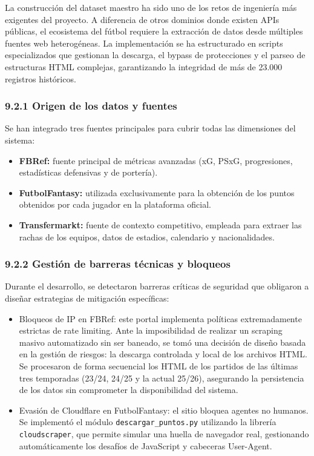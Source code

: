 La construcción del dataset maestro ha sido uno de los retos de ingeniería más exigentes del proyecto. A diferencia de otros dominios donde existen APIs públicas,
el ecosistema del fútbol requiere la extracción de datos desde múltiples fuentes web heterogéneas. La implementación se ha estructurado en scripts especializados
que gestionan la descarga, el bypass de protecciones y el parseo de estructuras HTML complejas, garantizando la integridad de más de 23.000 registros históricos.
 
\subsubsection{9.2.1 Origen de los datos y fuentes}
 
Se han integrado tres fuentes principales para cubrir todas las dimensiones del sistema:
 
\begin{itemize}
\item \textbf{FBRef:} fuente principal de métricas avanzadas (xG, PSxG, progresiones, estadísticas defensivas y de portería).
\item \textbf{FutbolFantasy:} utilizada exclusivamente para la obtención de los puntos obtenidos por cada jugador en la plataforma oficial.
\item \textbf{Transfermarkt:} fuente de contexto competitivo, empleada para extraer las rachas de los equipos, datos de estadios, calendario y nacionalidades.
\end{itemize}
 
\subsubsection{9.2.2 Gestión de barreras técnicas y bloqueos}
 
Durante el desarrollo, se detectaron barreras críticas de seguridad que obligaron a diseñar estrategias de mitigación específicas:
 
\begin{itemize}
\item Bloqueos de IP en FBRef: este portal implementa políticas extremadamente estrictas de rate limiting. Ante la imposibilidad de realizar un scraping masivo
automatizado sin ser baneado, se tomó una decisión de diseño basada en la gestión de riesgos: la descarga controlada y local de los archivos HTML. Se procesaron
de forma secuencial los HTML de los partidos de las últimas tres temporadas (23/24, 24/25 y la actual 25/26), asegurando la persistencia de los datos sin comprometer
la disponibilidad del sistema.
 
\item Evasión de Cloudflare en FutbolFantasy: el sitio bloquea agentes no humanos. Se implementó el módulo \texttt{descargar\_puntos.py} utilizando la librería \texttt{cloudscraper}, que permite simular una huella de navegador real, gestionando automáticamente los desafíos de JavaScript y cabeceras User-Agent.
\end{itemize}
 
